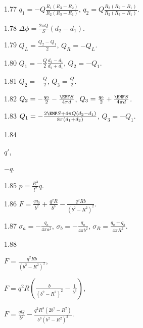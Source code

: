 \begin{Solution}{1.{77}}
	$q_1 = -Q\frac{R_1(R_3 - R_2)}{R_2(R_3 - R_1)}$, $q_2 = Q\frac{R_3(R_2 - R_1)}{R_2(R_3 - R_1)}$.
\end{Solution}
\begin{Solution}{1.{78}}
	$\Delta\phi = \frac{2\pi Q}{S} (d_2 - d_1)$.
\end{Solution}
\begin{Solution}{1.{79}}
	$Q_{L} = \frac{Q_2 - Q_1}{2}$, $Q_{R} = -Q_{L}$.
\end{Solution}
\begin{Solution}{1.{80}}
	$Q_1 = -\frac{Q}{2}\frac{d_2 - d_1}{d_2 + d_1}$, $Q_2 = - Q_1$.
\end{Solution}
\begin{Solution}{1.{81}}
	$Q_2 = -\frac{Q}{2}$, $Q_3 = \frac{Q}{2}$.
\end{Solution}
\begin{Solution}{1.{82}}
	$Q_2 = -\frac{q_0}{2} -\frac{\EMF S}{4\pi d}$, $Q_3 = \frac{q_0}{2} + \frac{\EMF S}{4\pi d}$.
\end{Solution}
\begin{Solution}{1.{83}}
	$Q_1 = -\frac{2\EMF S + 4\pi Q(d_2 - d_1)}{8\pi(d_1 + d_2)}$, $Q_3 = -Q_1$.
\end{Solution}
\begin{Solution}{1.{84}}
	\begin{enumerate*}[label=\alph*)]
	\item  $q'$,
	\item  $-q$.
	\end{enumerate*}
\end{Solution}
\begin{Solution}{1.{85}}
		$p = \frac{R^3}{l^2} q$.
	
\end{Solution}
\begin{Solution}{1.{86}}
	$ F =  \frac{qq_0}{b^2} + \frac{q^2 R}{b^3} - \frac{q^2 Rb}{(b^2 - R^2)^2}$.
\end{Solution}
\begin{Solution}{1.{87}}
	$\sigma_a = -\frac{q_a}{4\pi a^2}$, $\sigma_b = -\frac{q_a}{4\pi b^2}$, $\sigma_R = \frac{q_a + q_b}{4\pi R^2}$.
\end{Solution}
\begin{Solution}{1.{88}}
	\begin{enumerate*}[label=\alph*)]
		\item $F = \frac{q^2Rb}{(b^2-R^2)^2} $,
		\item $F = q^2R\left( \frac{b}{(b^2-R^2)^2} - \frac{1}{b^3}\right)$,
		\item $F = \frac{qQ}{b^2} - \frac{q^2R^3(2b^2 - R^2)}{b^3(b^2 - R^2)^2}$.
	\end{enumerate*}
\end{Solution}
